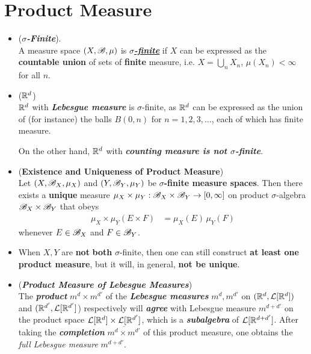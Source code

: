 \documentclass[11pt]{article}
\begin{document}
\section{Product Measure}
\begin{itemize}
\item \begin{definition} (\textbf{\emph{$\sigma$-Finite}}).\\
A measure space $(X, {\mathscr B}, \mu)$ is \underline{\textbf{\emph{$\sigma$-finite}}} if $X$ can be expressed as the \textbf{countable union} of sets of \textbf{finite} measure, i.e. $X = \bigcup_{n}X_n$, $\mu(X_n) < \infty$ for all $n$.
\end{definition}

\item \begin{example} (${\mathbb R}^d$)\\
${\mathbb R}^d$ with \textbf{\emph{Lebesgue measure}} is $\sigma$-finite, as ${\mathbb R}^d$ can be expressed as the union of (for instance) the balls $B(0, n)$ for
$n = 1, 2, 3, \ldots$, each of which has finite measure. 

On the other hand, ${\mathbb R}^d$ with \textbf{\emph{counting measure is not $\sigma$-finite}}.
\end{example}

\item \begin{proposition}  (\textbf{Existence and Uniqueness of Product Measure}) \citep{tao2011introduction}\\
Let $(X, {\mathscr B}_X, \mu_X)$ and $(Y, {\mathscr B}_Y, \mu_Y)$ be \textbf{$\sigma$-finite measure spaces}. Then there exists a \textbf{unique} measure $\mu_X \times \mu_Y: {\mathscr B}_X \times {\mathscr B}_Y \to [0, \infty]$ on product $\sigma$-algebra ${\mathscr B}_X \times {\mathscr B}_Y$ that obeys 
\begin{align*}
\mu_X \times \mu_Y(E \times F) &= \mu_X(E)\,\mu_Y(F)
\end{align*} whenever $E \in {\mathscr B}_X$ and $F \in {\mathscr B}_Y$.
\end{proposition}

\item \begin{remark}
When $X, Y$ are \textbf{not} \textbf{both} $\sigma$-finite, then one can still construct \textbf{at least one product measure}, but it will, in general, \textbf{not be unique}. 
\end{remark}

\item \begin{remark} (\emph{\textbf{Product Measure of Lebesgue Measures}})\\
The \textbf{\emph{product}} $m^d \times m^{d'}$ of the \textbf{\emph{Lebesgue measures}} $m^d, m^{d'}$ on $({\mathbb R}^d, {\mathcal L}[{\mathbb R}^d])$ and $({\mathbb R}^{d'}, {\mathcal L}[{\mathbb R}^{d'}]$) respectively will \textbf{\emph{agree}} with Lebesgue measure $m^{d+d'}$ on the product space ${\mathcal L}[{\mathbb R}^d] \times  {\mathcal L}[{\mathbb R}^{d'}]$, which is a \textbf{\emph{subalgebra}} of ${\mathcal L}[{\mathbb R}^{d+d'}]$. After taking the \emph{\textbf{completion}} $\overline{m^d \times m^{d'}}$ of this product measure, one obtains the \emph{full Lebesgue measure} $m^{d+d'}$.
\end{remark}


\end{itemize}
\end{document}

